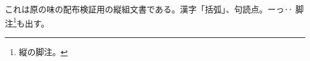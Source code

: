 \documentclass[pdflatex,tate,pdftex_fontset=haranoaji]{jlreq}
\begin{document}
これは原の味の配布検証用の縦組文書である。漢字「括弧」、句読点。ーっ‥
脚注\footnote{縦の脚注。}も出す。
\end{document}

